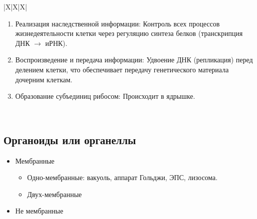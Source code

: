 \documentclass[12pt]{article}
\begin{document}
\begin{xltabular}{\textwidth}{|X|X|X|}
\begin{enumerate}
			\item Реализация наследственной информации: Контроль всех процессов жизнедеятельности клетки через регуляцию синтеза белков (транскрипция ДНК $\rightarrow$ иРНК).
			\item Воспроизведение и передача информации: Удвоение ДНК (репликация) перед делением клетки, что обеспечивает передачу генетического материала дочерним клеткам.
			\item Образование субъединиц рибосом: Происходит в ядрышке.
		\end{enumerate}\\
		\hline
	\end{xltabular}
	\subsection{Органоиды или органеллы}
	\begin{itemize}
		\item Мембранные
		\begin{itemize}
			\item Одно-мембранные: вакуоль, аппарат Гольджи, ЭПС, лизосома.
			\item Двух-мембранные
		\end{itemize}
		\item Не мембранные
	\end{itemize}
\end{document}

